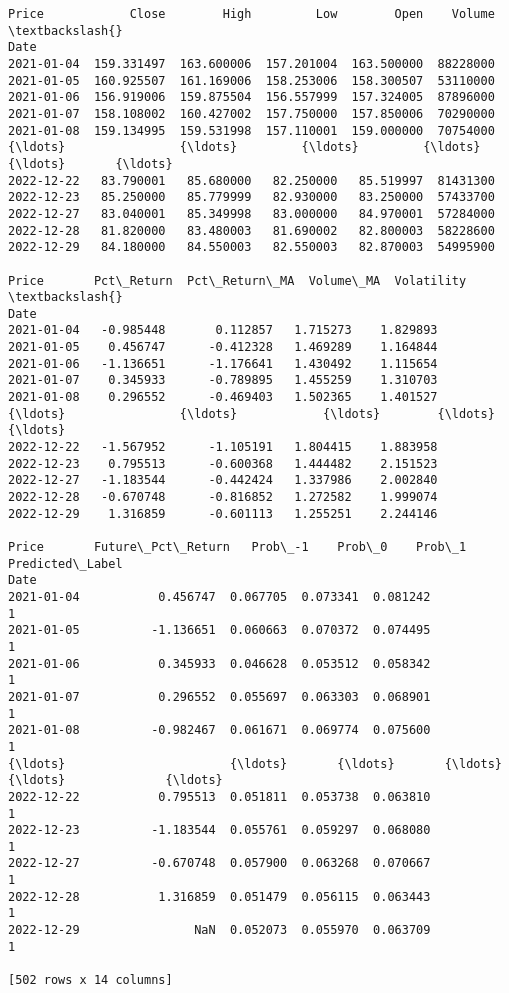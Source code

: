 \documentclass[11pt]{article}
\makeatletter
\newcommand{\boxspacing}{\kern\kvtcb@left@rule\kern\kvtcb@boxsep}
\newcommand{\prompt}[4]{
        {\ttfamily\llap{{\color{#2}[#3]:\hspace{3pt}#4}}\vspace{-\baselineskip}}
    }
\makeatother
\begin{document}
            \begin{tcolorbox}[breakable, size=fbox, boxrule=.5pt, pad at break*=1mm, opacityfill=0]
\prompt{Out}{outcolor}{256}{\boxspacing}
\begin{Verbatim}[commandchars=\\\{\}]
Price            Close        High         Low        Open    Volume  \textbackslash{}
Date
2021-01-04  159.331497  163.600006  157.201004  163.500000  88228000
2021-01-05  160.925507  161.169006  158.253006  158.300507  53110000
2021-01-06  156.919006  159.875504  156.557999  157.324005  87896000
2021-01-07  158.108002  160.427002  157.750000  157.850006  70290000
2021-01-08  159.134995  159.531998  157.110001  159.000000  70754000
{\ldots}                {\ldots}         {\ldots}         {\ldots}         {\ldots}       {\ldots}
2022-12-22   83.790001   85.680000   82.250000   85.519997  81431300
2022-12-23   85.250000   85.779999   82.930000   83.250000  57433700
2022-12-27   83.040001   85.349998   83.000000   84.970001  57284000
2022-12-28   81.820000   83.480003   81.690002   82.800003  58228600
2022-12-29   84.180000   84.550003   82.550003   82.870003  54995900

Price       Pct\_Return  Pct\_Return\_MA  Volume\_MA  Volatility  \textbackslash{}
Date
2021-01-04   -0.985448       0.112857   1.715273    1.829893
2021-01-05    0.456747      -0.412328   1.469289    1.164844
2021-01-06   -1.136651      -1.176641   1.430492    1.115654
2021-01-07    0.345933      -0.789895   1.455259    1.310703
2021-01-08    0.296552      -0.469403   1.502365    1.401527
{\ldots}                {\ldots}            {\ldots}        {\ldots}         {\ldots}
2022-12-22   -1.567952      -1.105191   1.804415    1.883958
2022-12-23    0.795513      -0.600368   1.444482    2.151523
2022-12-27   -1.183544      -0.442424   1.337986    2.002840
2022-12-28   -0.670748      -0.816852   1.272582    1.999074
2022-12-29    1.316859      -0.601113   1.255251    2.244146

Price       Future\_Pct\_Return   Prob\_-1    Prob\_0    Prob\_1  Predicted\_Label
Date
2021-01-04           0.456747  0.067705  0.073341  0.081242                1
2021-01-05          -1.136651  0.060663  0.070372  0.074495                1
2021-01-06           0.345933  0.046628  0.053512  0.058342                1
2021-01-07           0.296552  0.055697  0.063303  0.068901                1
2021-01-08          -0.982467  0.061671  0.069774  0.075600                1
{\ldots}                       {\ldots}       {\ldots}       {\ldots}       {\ldots}              {\ldots}
2022-12-22           0.795513  0.051811  0.053738  0.063810                1
2022-12-23          -1.183544  0.055761  0.059297  0.068080                1
2022-12-27          -0.670748  0.057900  0.063268  0.070667                1
2022-12-28           1.316859  0.051479  0.056115  0.063443                1
2022-12-29                NaN  0.052073  0.055970  0.063709                1

[502 rows x 14 columns]
\end{Verbatim}
\end{tcolorbox}
        
\end{document}
